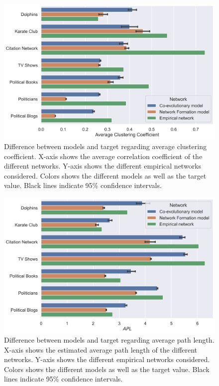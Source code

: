 \documentclass{article}
\begin{document}
\begin{figure}[H]
    \centering
    \includegraphics[width=.8\linewidth]{../plots/overall/Model_Evaluation_Average_Clustering.png}
  \caption{Difference between models and target regarding average clustering coefficient. X-axis shows the average correlation coefficient of the different networks. Y-axis shows the different empirical networks considered. Colors shows the different models as well as the target value. Black lines indicate 95\% confidence intervals.}
  \label{fig:eval_clustering}
\end{figure}

\begin{figure}[H]
    \centering
    \includegraphics[width=.8\linewidth]{../plots/overall/Model_Evaluation_APL.png}
  \caption{Difference between models and target regarding average path length. X-axis shows the estimated average path length of the different networks. Y-axis shows the different empirical networks considered. Colors shows the different models as well as the target value. Black lines indicate 95\% confidence intervals.}
  \label{fig:eval_path}
\end{figure}
\end{document}
